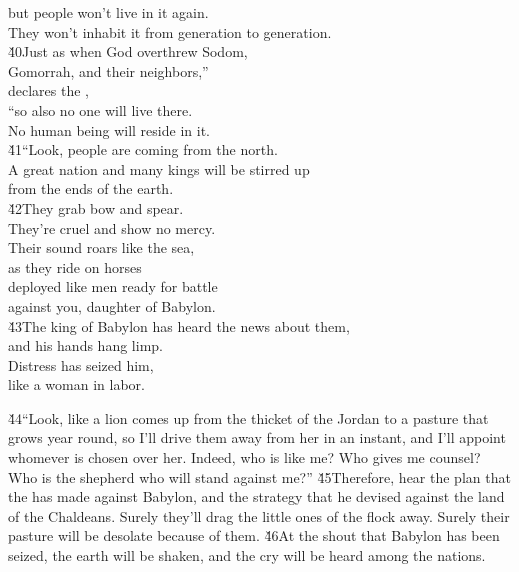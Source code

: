 \begin{poetry}
\poemll    but people won't live in it again. \\
\poemlll       They won't inhabit it from generation to generation. \\
\poeml \v{40}Just as when God overthrew Sodom, \\
\poemll    Gomorrah, and their neighbors,'' \\
\poemlll       declares the , \\
\poeml ``so also no one will live there. \\
\poemll    No human being will reside in it. \\
\poeml \v{41}``Look, people are coming from the north. \\
\poemll    A great nation and many kings will be stirred up \\
\poemlll       from the ends of the earth. \\
\poeml \v{42}They grab bow and spear. \\
\poemll    They're cruel and show no mercy. \\
\poeml Their sound roars like the sea, \\
\poemll    as they ride on horses \\
\poeml deployed like men ready for battle \\
\poemll    against you, daughter of Babylon. \\
\poeml \v{43}The king of Babylon has heard the news about them, \\
\poemll    and his hands hang limp. \\
\poeml Distress has seized him, \\
\poemll    like a woman in labor.
\end{poetry}

\v{44}``Look, like a lion comes up from the thicket of the Jordan to a pasture that grows year round, so I'll drive them away from her in an instant, and I'll appoint whomever is chosen over her. Indeed, who is like me? Who gives me counsel? Who is the shepherd who will stand against me?'' \v{45}Therefore, hear the plan that the  has made against Babylon, and the strategy that he devised against the land of the Chaldeans. Surely they'll drag the little ones of the flock away. Surely their pasture will be desolate because of them. \v{46}At the shout that Babylon has been seized, the earth will be shaken, and the cry will be heard among the nations.

